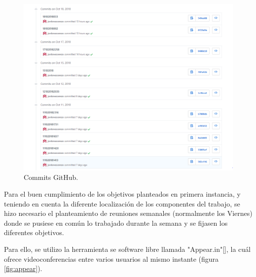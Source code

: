 \begin{figure}[H]
	\center
	\includegraphics[trim = 0mm 0mm 0mm 0mm, clip,scale=0.5]{imagenes/Introduction/CapturaGit}
	\caption{Commits GitHub.}
	\label{fig:capturaGit}
\end{figure}

Para el buen cumplimiento de los objetivos planteados en primera instancia, y teniendo en cuenta la diferente localización de los componentes del trabajo, se hizo necesario el planteamiento de reuniones semanales (normalmente los Viernes) donde se pusiese en común lo trabajado durante la semana y se fijasen los diferentes objetivos. \newline

Para ello, se utilizo la herramienta se software libre llamada "Appear.in"[], la cuál ofrece videoconferencias entre varios usuarios al mismo instante (figura \ref{fig:appear}). 

